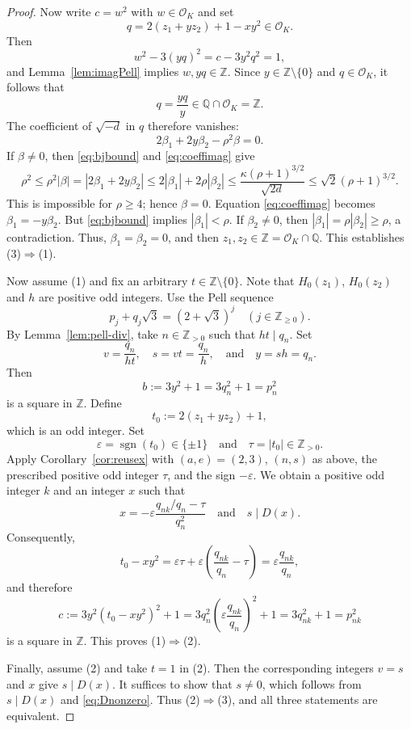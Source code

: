 \documentclass[12pt]{amsart}
\numberwithin{equation}{section}
\theoremstyle{remark}
\theoremstyle{plain}
\newcommand{\Z}{\mathbb{Z}}
\newcommand{\Q}{\mathbb{Q}}
\newcommand{\sO}{\mathcal{O}}
\begin{document}
\begin{proof}
Now write $c=w^2$ with $w\in\sO_K$ and set
\[
q=2(z_1+yz_2)+1-xy^2\in\sO_K.
\]
Then
\[
w^2-3(yq)^2=c-3y^2q^2=1,
\]
and Lemma~\ref{lem:imagPell} implies $w,yq\in\Z$. Since $y\in\Z\setminus\{0\}$ and $q\in\sO_K$, it follows that
\[
q=\frac{yq}{y}\in\Q\cap\sO_K=\Z.
\]
The coefficient of $\sqrt{-d}$ in $q$ therefore vanishes:
\begin{equation}\label{eq:coeffimag}
2\beta_1+2y\beta_2-\rho^2\beta=0.
\end{equation}
If $\beta\neq0$, then \eqref{eq:bjbound} and \eqref{eq:coeffimag} give
\[
\rho^2\leq\rho^2|\beta|=|2\beta_1+2y\beta_2|\leq2|\beta_1|+2\rho|\beta_2|\leq\frac{\kappa(\rho+1)^{3/2}}{\sqrt{2d}}\leq\sqrt{2}(\rho+1)^{3/2}.
\]
This is impossible for $\rho\geq4$; hence $\beta=0$. Equation \eqref{eq:coeffimag} becomes $\beta_1=-y\beta_2$. But \eqref{eq:bjbound} implies $|\beta_1|<\rho$. If $\beta_2\neq0$, then $|\beta_1|=\rho|\beta_2|\geq\rho$, a contradiction. Thus, $\beta_1=\beta_2=0$, and then $z_1,z_2\in\Z=\sO_K\cap\Q$. This establishes \textup{(3)}$\Rightarrow$\textup{(1)}.

\smallskip

Now assume \textup{(1)} and fix an arbitrary $t\in\Z\setminus\{0\}$. Note that $H_0(z_1)$, $H_0(z_2)$ and $h$ are positive odd integers. Use the Pell sequence
\[
p_j+q_j\sqrt3=(2+\sqrt3)^j\quad(j\in\Z_{\geq0}).
\]
By Lemma~\ref{lem:pell-div}, take $n\in\Z_{>0}$ such that $ht\mid q_n$. Set
\[
v=\frac{q_n}{ht},\quad s=vt=\frac{q_n}{h},\quad\text{and}\quad y=sh=q_n.
\]
Then
\[
b:=3y^2+1=3q_n^2+1=p_n^2
\]
is a square in $\Z$. Define
\[
t_0:=2(z_1+yz_2)+1,
\]
which is an odd integer. Set
\[
\varepsilon=\operatorname{sgn}(t_0)\in\{\pm1\}\quad\text{and}\quad\tau=|t_0|\in\Z_{>0}.
\]
Apply Corollary~\ref{cor:reusex} with $(a,e)=(2,3)$, $(n,s)$ as above, the prescribed positive odd integer $\tau$, and the sign $-\varepsilon$. We obtain a positive odd integer $k$ and an integer $x$ such that
\[
x=-\varepsilon\frac{q_{nk}/q_n-\tau}{q_n^2}\quad\text{and}\quad s\mid D(x).
\]
Consequently,
\[
t_0-xy^2=\varepsilon\tau+\varepsilon\left(\frac{q_{nk}}{q_n}-\tau\right)=\varepsilon\frac{q_{nk}}{q_n},
\]
and therefore
\[
c:=3y^2(t_0-xy^2)^2+1=3q_n^2\left(\varepsilon\frac{q_{nk}}{q_n}\right)^2+1=3q_{nk}^2+1=p_{nk}^2
\]
is a square in $\Z$. This proves \textup{(1)}$\Rightarrow$\textup{(2)}.

\smallskip

Finally, assume \textup{(2)} and take $t=1$ in \textup{(2)}. Then the corresponding integers $v=s$ and $x$ give $s\mid D(x)$. It suffices to show that $s\neq0$, which follows from $s\mid D(x)$ and \eqref{eq:Dnonzero}. Thus \textup{(2)}$\Rightarrow$\textup{(3)}, and all three statements are equivalent.
\end{proof}
\end{document}
